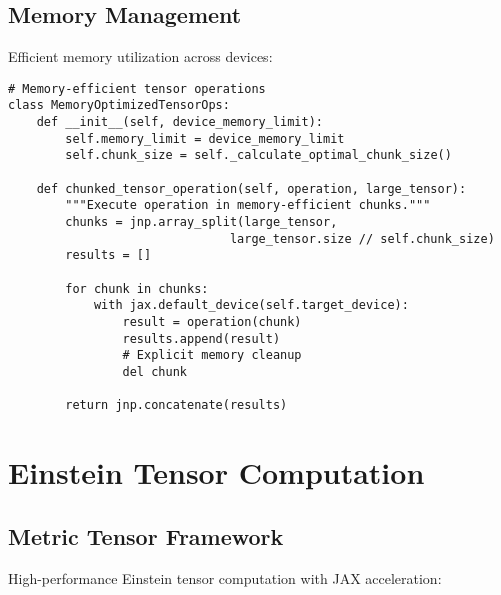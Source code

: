 \documentclass{article}
\begin{document}
\subsection{Memory Management}

Efficient memory utilization across devices:

\begin{lstlisting}
# Memory-efficient tensor operations
class MemoryOptimizedTensorOps:
    def __init__(self, device_memory_limit):
        self.memory_limit = device_memory_limit
        self.chunk_size = self._calculate_optimal_chunk_size()
    
    def chunked_tensor_operation(self, operation, large_tensor):
        """Execute operation in memory-efficient chunks."""
        chunks = jnp.array_split(large_tensor, 
                               large_tensor.size // self.chunk_size)
        results = []
        
        for chunk in chunks:
            with jax.default_device(self.target_device):
                result = operation(chunk)
                results.append(result)
                # Explicit memory cleanup
                del chunk
        
        return jnp.concatenate(results)
\end{lstlisting}

\section{Einstein Tensor Computation}

\subsection{Metric Tensor Framework}

High-performance Einstein tensor computation with JAX acceleration:
\end{document}

